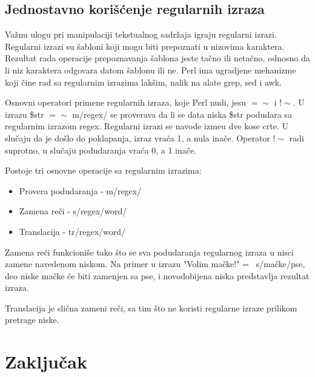 \documentclass[a4paper]{article}
\begin{document}
\subsection{Jednostavno korišćenje regularnih izraza}

Važnu ulogu pri manipulaciji tekstualnog sadržaja igraju regularni izrazi. Regularni izrazi su šabloni koji mogu biti prepoznati u nizovima karaktera. Rezultat rada operacije prepoznavanja šablona jeste tačno ili netačno, odnosno da li niz karaktera odgovara datom šablonu ili ne. Perl ima ugradjene mehanizme koji čine rad sa regularnim izrazima lakšim, nalik na alate grep, sed i awk.\cite{sed} %



Osnovni operatori primene regularnih izraza, koje Perl nudi, jesu $=\sim$ i $!\sim$. U izrazu \$str $=\sim$ m/regex/ se proverava da li se data niska \$str podudara sa regularnim izrazom regex. Regularni izrazi se navode izme\dj{}u dve kose crte. U slučaju da je došlo do poklapanja, izraz vraća 1, a nula inače. Operator $!\sim$ radi suprotno, u slučaju podudaranja vraća 0, a 1 inače.

Postoje tri osnovne operacije sa regularnim izrazima:

\begin{itemize}
  \item Provera podudaranja - m/regex/
  \item Zamena re\v ci - s/regex/word/
  \item Translacija - tr/regex/word/
\end{itemize}

Zamena reči funkcioniše tako što se sva podudaranja regularnog izraza u nisci zamene navedenom niskom. Na primer u izrazu "Volim mačke!" =~ s/mačke/pse, deo niske mačke \' ce biti zamenjen sa pse, i novodobijena niska predstavlja rezultat izraza.

Translacija je slična zameni reči, sa tim što ne koristi regularne izraze prilikom pretrage niske.


\section{Zaključak}
\label{sec:zakljucak}
\end{document}
